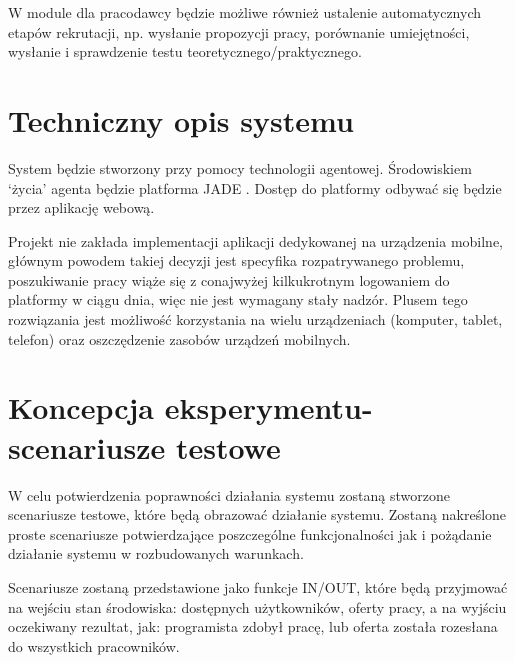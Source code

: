\documentclass[11pt,a4paper]{article}
\begin{document}
W module dla pracodawcy będzie możliwe również ustalenie automatycznych etapów rekrutacji, np. wysłanie propozycji pracy, porównanie umiejętności, wysłanie i sprawdzenie testu teoretycznego/praktycznego.


\section{Techniczny opis systemu}
System będzie stworzony przy pomocy technologii agentowej. Środowiskiem `życia' agenta będzie platforma JADE . Dostęp do platformy odbywać się będzie przez aplikację webową.

Projekt nie zakłada implementacji aplikacji dedykowanej na urządzenia mobilne, głównym powodem takiej decyzji jest specyfika rozpatrywanego problemu, poszukiwanie pracy wiąże się z conajwyżej kilkukrotnym logowaniem do platformy w ciągu dnia, więc nie jest wymagany stały nadzór. Plusem tego rozwiązania jest możliwość korzystania na wielu urządzeniach (komputer, tablet, telefon) oraz oszczędzenie zasobów urządzeń mobilnych.


\section{Koncepcja eksperymentu- scenariusze testowe}
W celu potwierdzenia poprawności działania systemu zostaną stworzone scenariusze testowe, które będą obrazować działanie systemu. Zostaną nakreślone proste scenariusze potwierdzające poszczególne funkcjonalności jak i pożądanie działanie systemu w rozbudowanych warunkach.

Scenariusze zostaną przedstawione jako funkcje IN/OUT, które będą przyjmować na wejściu stan środowiska: dostępnych użytkowników, oferty pracy, a na wyjściu oczekiwany rezultat, jak: programista zdobył pracę, lub oferta została rozesłana do wszystkich pracowników.
	
\end{document}
